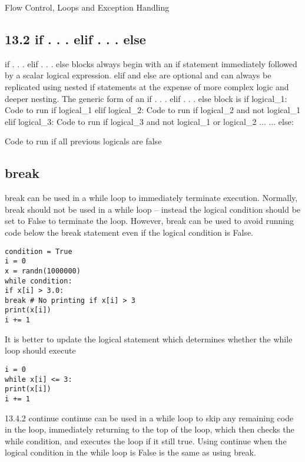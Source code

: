 Flow Control, Loops and Exception Handling
\subsection{13.2 if . . . elif . . . else}
if . . . elif . . . else blocks always begin with an if statement immediately followed by a scalar logical
expression. elif and else are optional and can always be replicated using nested if statements at the
expense of more complex logic and deeper nesting. The generic form of an if . . . elif . . . else block is
if logical_1:
Code to run if logical_1
elif logical_2:
Code to run if logical_2 and not logical_1
elif logical_3:
Code to run if logical_3 and not logical_1 or logical_2
...
...
else:

Code to run if all previous logicals are false


\newpage

\subsection{break}
break can be used in a while loop to immediately terminate execution. Normally, break should not be
used in a while loop – instead the logical condition should be set to False to terminate the loop. However,
break can be used to avoid running code below the break statement even if the logical condition is False.

\begin{framed}
\begin{verbatim}
condition = True
i = 0
x = randn(1000000)
while condition:
if x[i] > 3.0:
break # No printing if x[i] > 3
print(x[i])
i += 1
\end{verbatim}
\end{framed}

It is better to update the logical statement which determines whether the while loop should execute

\begin{framed}
\begin{verbatim}
i = 0
while x[i] <= 3:
print(x[i])
i += 1
\end{verbatim}
\end{framed}
13.4.2 continue
continue can be used in a while loop to skip any remaining code in the loop, immediately returning to the
top of the loop, which then checks the while condition, and executes the loop if it still true. Using continue
when the logical condition in the while loop is False is the same as using break.



